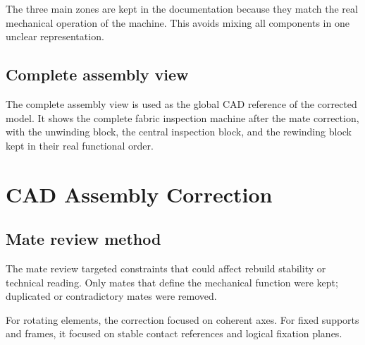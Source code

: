 The three main zones are kept in the documentation because they match the real mechanical operation of the machine. This avoids mixing all components in one unclear representation.

\subsection{Complete assembly view}

The complete assembly view is used as the global CAD reference of the corrected model. It shows the complete fabric inspection machine after the mate correction, with the unwinding block, the central inspection block, and the rewinding block kept in their real functional order.

\section{CAD Assembly Correction}

\subsection{Mate review method}

The mate review targeted constraints that could affect rebuild stability or technical reading. Only mates that define the mechanical function were kept; duplicated or contradictory mates were removed.

For rotating elements, the correction focused on coherent axes. For fixed supports and frames, it focused on stable contact references and logical fixation planes.

\begin{table}[H]
\centering
\small
\caption{CAD mate correction strategy}
\label{tab:chapter2-3}
\end{table}

